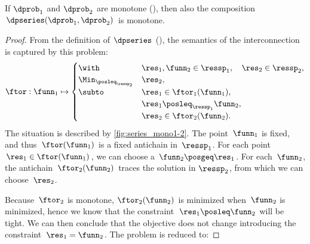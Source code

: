\begin{proposition}
\label{pro:series-monotone}If $\dprob_{1}$ and $\dprob_{2}$ are
monotone (), then also the composition $\dpseries(\dprob_{1},\dprob_{2})$
is monotone.
\end{proposition}
\begin{proof}
From the definition of $\dpseries$ (),
the semantics of the interconnection is captured by this problem:
\begin{equation}
\ftor:\funn_{1}\mapsto\begin{cases}
\with & \res_{1},\funn_{2}\in\ressp_{1},\quad\res_{2}\in\ressp_{2},\\
\Min_{\posleq_{\ressp_{2}}} & \res_{2},\\
\subto & \res_{1}\in\ftor_{1}(\funn_{1}),\\
 & \res_{1}\posleq_{\ressp_{1}}\funn_{2},\\
 & \res_{2}\in\ftor_{2}(\funn_{2}).
\end{cases}\label{eq:dede}
\end{equation}
The situation is described by \cref{fig:series_mono1-2}. The point~$\funn_{1}$
is fixed, and thus~$\ftor(\funn_{1})$ is a fixed antichain in~$\ressp_{1}$.
For each point $\res_{1}\in\ftor(\funn_{1})$, we can choose a $\funn_{2}\posgeq\res_{1}$.
For each~$\funn_{2}$, the antichain~$\ftor_{2}(\funn_{2})$ traces
the solution in $\ressp_{2}$, from which we can choose~$\res_{2}$.


\noindent Because~$\ftor_{2}$ is monotone, $\ftor_{2}(\funn_{2})$
is minimized when~$\funn_{2}$ is minimized, hence we know that the
constraint~$\res_{1}\posleq\funn_{2}$ will be tight. We can then
conclude that the objective does not change introducing the constraint~$\res_{1}=\funn_{2}$.
The problem is reduced to:


\end{proof}
